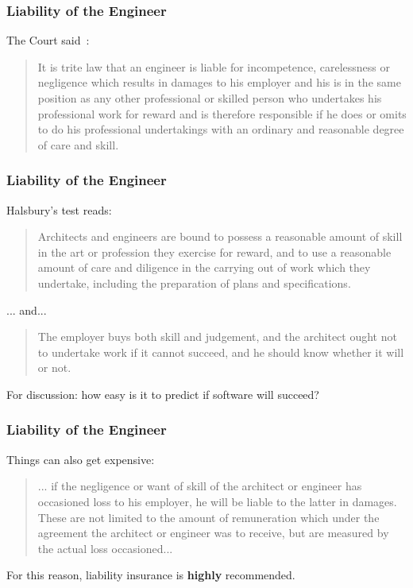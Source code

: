 \begin{frame}
\frametitle{Liability of the Engineer}

The Court said~\cite{lpe}:

\begin{quote}
	It is trite law that an engineer is liable for incompetence, carelessness or negligence which results in damages to his employer and his is in the same position as any other professional or skilled person who undertakes his professional work for reward and is therefore responsible if he does or omits to do his professional undertakings with an ordinary and reasonable degree of care and skill.
\end{quote}

\end{frame}



\begin{frame}
\frametitle{Liability of the Engineer}

Halsbury's test reads:

\begin{quote}
	Architects and engineers are bound to possess a reasonable amount of skill in the art or profession they exercise for reward, and to use a reasonable amount of care and diligence in the carrying out of work which they undertake, including the preparation of plans and specifications.
\end{quote}

... and... 

\begin{quote}
	The employer buys both skill and judgement, and the architect ought not to undertake work if it cannot succeed, and he should know whether it will or not.
\end{quote}

For discussion: how easy is it to predict if software will succeed?

\end{frame}



\begin{frame}
\frametitle{Liability of the Engineer}

Things can also get expensive:

\begin{quote}
... if the negligence or want of skill of the architect or engineer has occasioned loss to his employer, he will be liable to the latter in damages. These are not limited to the amount of remuneration which under the agreement the architect or engineer was to receive, but are measured by the actual loss occasioned...
\end{quote}

For this reason, liability insurance is \textbf{highly} recommended.

\end{frame}



